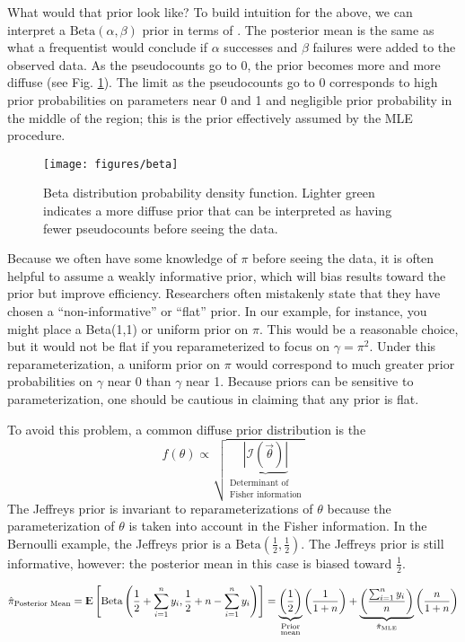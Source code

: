 \documentclass[11pt]{article}
\newcommand{\E}{{\rm I\kern-.3em E}}
\newcommand{\bgreen}[1]{\textbf{\color{olive}{#1}}}
\begin{document}
What would that prior look like? To build intuition for the above, we can interpret a $\text{Beta}(\alpha,\beta)$ prior in terms of \bgreen{pseudocounts}. The posterior mean is the same as what a frequentist would conclude if $\alpha$ successes and $\beta$ failures were added to the observed data. As the pseudocounts go to 0, the prior becomes more and more diffuse (see Fig. \ref{fig:beta}). The limit as the pseudocounts go to 0 corresponds to high prior probabilities on parameters near 0 and 1 and negligible prior probability in the middle of the region; this is the prior effectively assumed by the MLE procedure.

\begin{figure}[!ht]
\centering
\texttt{[image: figures/beta]}
\caption{Beta distribution probability density function. Lighter green indicates a more diffuse prior that can be interpreted as having fewer pseudocounts before seeing the data.}
\label{fig:beta}
\end{figure}

Because we often have some knowledge of $\pi$ before seeing the data, it is often helpful to assume a weakly informative prior, which will bias results toward the prior but improve efficiency. Researchers often mistakenly state that they have chosen a ``non-informative'' or ``flat'' prior. In our example, for instance, you might place a Beta(1,1) or uniform prior on $\pi$. This would be a reasonable choice, but it would not be flat if you reparameterized to focus on $\gamma = \pi^2$. Under this reparameterization, a uniform prior on $\pi$ would correspond to much greater prior probabilities on $\gamma$ near 0 than $\gamma$ near 1. Because priors can be sensitive to parameterization, one should be cautious in claiming that any prior is flat.

To avoid this problem, a common diffuse prior distribution is the \bgreen{Jeffreys prior}
$$f(\theta)\propto\sqrt{\underbrace{\left\lvert\mathcal{I}\left(\vec\theta\right)\right\rvert}_{\substack{\text{Determinant of}\\\text{Fisher information}}}}$$
The Jeffreys prior is invariant to reparameterizations of $\theta$ because the parameterization of $\theta$ is taken into account in the Fisher information. In the Bernoulli example, the Jeffreys prior is a $\text{Beta}\left(\frac{1}{2},\frac{1}{2}\right)$. The Jeffreys prior is still informative, however: the posterior mean in this case is biased toward $\frac{1}{2}$.

$$\hat\pi_\text{Posterior Mean} = 
	\E\left[\text{Beta}\left(\frac{1}{2}+ \sum_{i=1}^n y_i,\frac{1}{2} + n - \sum_{i=1}^n y_i\right)\right] = 
	\underbrace{\left(\frac{1}{2}\right)}_{\substack{\text{Prior}\\\text{mean}}}\left(\frac{1}{1+n}\right) + 
		\underbrace{\left(\frac{\sum_{i=1}^n y_i}{n}\right)}_{\hat\pi_\text{MLE}}\left(\frac{n}{1 + n}\right)$$
		
\end{document}
